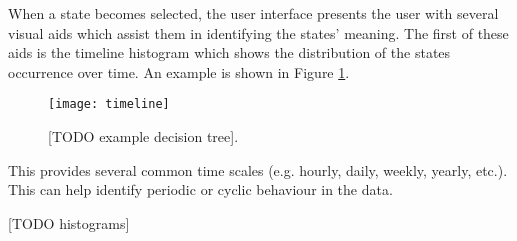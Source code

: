 When a state becomes selected, the user interface presents the user with several visual aids which
assist them in identifying the states' meaning. The first of these aids is the timeline histogram
which shows the distribution of the states occurrence over time. An example is shown in Figure 
\ref{fig:time-hist}.

\begin{figure}[h!]
	\centering
	\texttt{[image: timeline]}
	\caption{[TODO example decision tree].}
	\label{fig:time-hist}
\end{figure}

This provides several common time scales (e.g. hourly, daily, weekly, yearly, etc.). This can help identify periodic or cyclic behaviour in the data. 

[TODO histograms]
\fi
